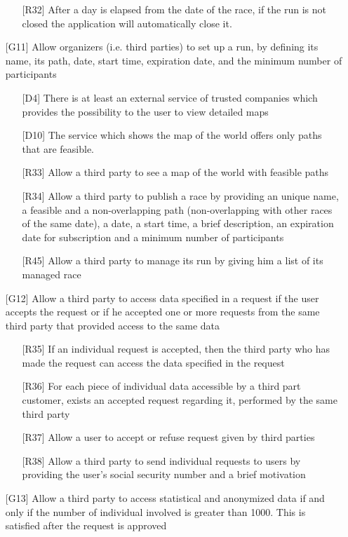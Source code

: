 \begin{itemize}
\begin{itemize}
	\item[{[R32]}] After a day is elapsed from the date of the race, if the run is not closed the application will automatically close it.
	\end{itemize}
\item[{[G11]}] Allow organizers (i.e. third parties) to set up a run, by defining its name, its path, date, start time, expiration date, and the minimum number of participants
	\begin{itemize}
	\item[{[D4]}] There is at least an external service of trusted companies which provides the possibility to the user to view detailed maps
	\item[{[D10]}] The service which shows the map of the world offers only paths that are feasible.
	\item[{[R33]}] Allow a third party to see a map of the world with feasible paths
	\item[{[R34]}] Allow a third party to publish a race by providing an unique name, a feasible and a non-overlapping path (non-overlapping with other races of the same date), a date, a start time, a brief description, an expiration date for subscription and a minimum number of participants
	\item[{[R45]}] Allow a third party to manage its run by giving him a list of its managed race
	\end{itemize}
\item[{[G12]}] Allow a third party to access data specified in a request if the user accepts the request or if he accepted one or more requests from the same third party that provided access to the same data 
	\begin{itemize}
	\item[{[R35]}] If an individual request is accepted, then the third party who has made the request can access the data specified in the request
	\item[{[R36]}] For each piece of individual data accessible by a third part customer, exists an accepted request regarding it, performed by the same third party 
	\item[{[R37]}] Allow a user to accept or refuse request given by third parties
	\item[{[R38]}] Allow a third party to send individual requests to users by providing the user's social security number and a brief motivation
	\end{itemize}
\item[{[G13]}] Allow a third party to access statistical and anonymized data if and only if the number of individual involved is greater than 1000. This is satisfied after the request is approved  

\end{itemize}
